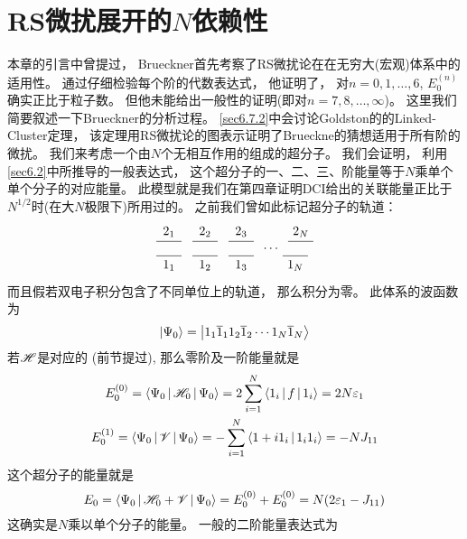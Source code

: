 \section{RS微扰展开的$N$依赖性}
本章的引言中曾提过， 
Brueckner首先考察了RS微扰论在在无穷大(宏观)体系中的适用性。
通过仔细检验每个阶的代数表达式，
他证明了，
对$n=0,1,\ldots,6$, 
$E_0^{(n)}$确实正比于粒子数。
但他未能给出一般性的证明(即对$n=7,8,\ldots,\infty$)。 
这里我们简要叙述一下Brueckner的分析过程。
\ref{sec6.7.2}中会讨论Goldston的的Linked-Cluster定理，
该定理用RS微扰论的图表示证明了Brueckne的猜想适用于所有阶的微扰。
我们来考虑一个由$N$个无相互作用的组成的超分子。
我们会证明，
利用\ref{sec6.2}中所推导的一般表达式，
这个超分子的一、二、三、阶能量等于$N$乘单个单个分子的对应能量。
此模型就是我们在第四章证明DCI给出的关联能量正比于$N^{1/2}$时(在大$N$极限下)所用过的。
之前我们曾如此标记超分子的轨道：
\begin{equation*}
\begin{tikzpicture}
\draw (0,0)--node[below]{$1_1$}++(0.7,0) ++(0.3,0)--node[below]{$1_2$}++(0.7,0) ++(0.3,0)--node[below]{$1_3$}++(0.7,0) ++(0.5,0.2) node{$\cdots$} +(.5,0) ++(0.3,-.2)--node[below]{$1_N$}++(0.7,0);

\draw (0,.4)--node[above]{$2_1$}++(0.7,0) ++(0.3,0)--node[above]{$2_2$}++(0.7,0) ++(0.3,0)--node[above]{$2_3$}++(0.7,0) ++(0.65,0.2)  +(.35,0) ++(0.3,-.2)--node[above]{$2_N$}++(0.7,0);
\end{tikzpicture}
\end{equation*}
而且假若双电子积分包含了不同单位上的轨道，
那么积分为零。
此体系的\hft 波函数为
\begin{equation}
\Ket{\Psi_0} = \Ket{1_1\overline{1}_1 1_2\overline{1}_2 \cdots 1_N\overline{1}_N}
\end{equation}
若$\mathscr{H}$是对应的\hft{} \ha(前节提过), 
那么零阶及一阶能量就是
\begin{subequations}
\begin{gather}
E_0^{(0)} = \Braket{\Psi_0|\mathscr{H}_0|\Psi_0}=2\sum_{i=1}^{N}\Braket{1_i|f|1_i}=2N\varepsilon_1\\
E_0^{(1)} = \Braket{\Psi_0|\mathscr{V}|\Psi_0}=-\sum_{i=1}^{N}\Braket{1+i1_i|1_i1_i}=-NJ_{11}
\label{6.80b}
\end{gather}
\end{subequations}
这个超分子的\hft 能量就是
\begin{equation}
E_0=\Braket{\Psi_0|\mathscr{H}_0+\mathscr{V}|\Psi_0} = E_0^{(0)} + E_0^{(0)} = N(2\varepsilon_1-J_{11})
\end{equation}
这确实是$N$乘以单个分子的\hft 能量。
一般的二阶能量表达式为
